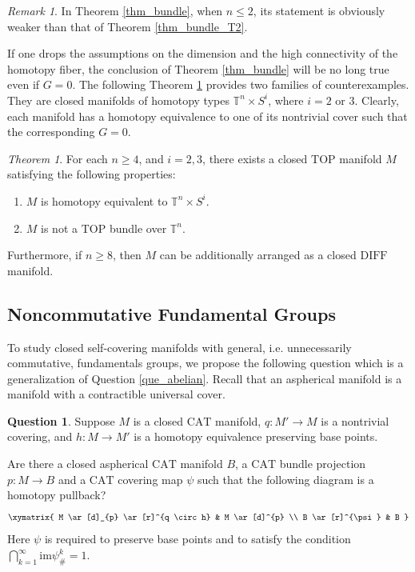 \documentclass[12pt]{amsart}
\theoremstyle{plain}
\theoremstyle{definition}
\theoremstyle{question}
\newtheorem{question}[theorem]{Question}
\theoremstyle{remark}
\newtheorem{remark}[theorem]{Remark}
\theoremstyle{assumption}
\numberwithin{equation}{section}
\theoremstyle{bigthm}
\newtheorem{bigthm}{Theorem}
\begin{document}
\begin{remark}
In Theorem \ref{thm_bundle}, when $n \le 2$, its statement is obviously weaker than that of Theorem \ref{thm_bundle_T2}.
\end{remark}

If one drops the assumptions on the dimension and the high connectivity of the homotopy fiber, the conclusion of Theorem \ref{thm_bundle} will be no long true even if $G=0$. The following Theorem \ref{thm_nonfibering} provides two families of counterexamples. They are closed manifolds of homotopy types $\mathbb{T}^{n} \times S^{i}$, where $i=2$ or $3$. Clearly, each manifold has a homotopy equivalence to one of its nontrivial cover such that the corresponding $G =0$.
\begin{bigthm}\label{thm_nonfibering}
For each $n \ge 4$, and $i=2,3$, there exists a closed $\mathrm{TOP}$ manifold $M$ satisfying the following properties:
\begin{enumerate}
\item $M$ is homotopy equivalent to $\mathbb{T}^{n} \times S^{i}$.

\item $M$ is not a $\mathrm{TOP}$ bundle over $\mathbb{T}^{n}$.
\end{enumerate}

Furthermore, if $n \ge 8$, then $M$ can be additionally arranged as a closed $\mathrm{DIFF}$ manifold.
\end{bigthm}

\subsection{Noncommutative Fundamental Groups}
To study closed self-covering manifolds with general, i.e. unnecessarily commutative, fundamentals groups, we propose the following question which is a generalization of Question \ref{que_abelian}. Recall that an aspherical manifold is a manifold with a contractible universal cover.
\begin{question}\label{que_nonabelian}
Suppose $M$ is a closed $\mathrm{CAT}$ manifold, $q \colon  M' \rightarrow M$ is a nontrivial covering, and $h \colon  M \rightarrow M'$ is a homotopy equivalence preserving base points.

Are there a closed aspherical $\mathrm{CAT}$ manifold $B$, a $\mathrm{CAT}$ bundle projection $p \colon  M \rightarrow B$ and a $\mathrm{CAT}$ covering map $\psi$ such that the following diagram is a homotopy pullback?
\begin{equation}\label{que_nonabelian_1}
\xymatrix{
  M \ar[d]_{p} \ar[r]^{q \circ h} & M \ar[d]^{p} \\
  B \ar[r]^{\psi} & B   }
\end{equation}
Here $\psi$ is required to preserve base points and to satisfy the condition $\bigcap_{k=1}^{\infty} \mathrm{im} \psi_{\#}^{k} = 1$.
\end{question}
\end{document}

